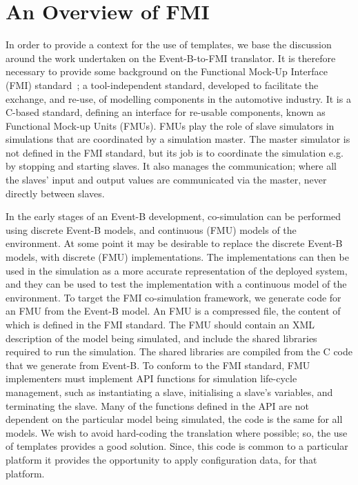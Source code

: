 \documentclass{llncs}%
\begin{document}
\section{An Overview of FMI}\label{FMI}
%
In order to provide a context for the use of templates, we base the discussion around the work undertaken on the Event-B-to-FMI translator. It is therefore necessary to provide some background on the Functional Mock-Up Interface (FMI) standard~\cite{bloch2012,bloch2011,FMISTD}; a tool-independent standard, developed to facilitate the exchange, and re-use, of modelling components in the automotive industry. It is a C-based standard, defining an interface for re-usable components, known as Functional Mock-up Units (FMUs). FMUs play the role of slave simulators in simulations that are coordinated by a simulation master. The master simulator is not defined in the FMI standard, but its job is to coordinate the simulation e.g. by stopping and starting slaves. It also manages the communication; where all the slaves' input and output values are communicated via the master, never directly between slaves. 

In the early stages of an Event-B development, co-simulation can be performed using discrete Event-B models, and continuous (FMU) models of the environment. At some point it may be desirable to replace the discrete Event-B models, with discrete (FMU) implementations. The implementations can then be used in the simulation as a more accurate representation of the deployed system, and they can be used to test the implementation with a continuous model of the environment. To target the FMI co-simulation framework, we generate code for an FMU from the Event-B model. An FMU is a compressed file, the content of which is defined in the FMI standard. The FMU should contain an XML description of the model being simulated, and include the shared libraries required to run the simulation. The shared libraries are compiled from the C code that we generate from Event-B. To conform to the FMI standard, FMU implementers must implement API functions for simulation life-cycle management, such as instantiating a slave, initialising a slave's variables, and terminating the slave. Many of the functions defined in the API are not dependent on the particular model being simulated, the code is the same for all models. We wish to avoid hard-coding the translation where possible; so, the use of templates provides a good solution. Since, this code is common to a particular platform it provides the opportunity to apply configuration data, for that platform.   
%
\end{document}
